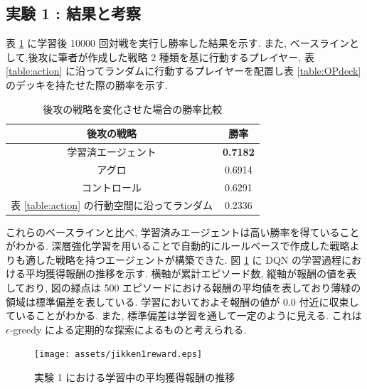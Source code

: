 \documentclass[12pt]{jarticle}
\begin{document}
\subsection{実験 1 : 結果と考察}
表 \ref{table:winratejikken1} に学習後 10000 回対戦を実行し勝率した結果を示す. また, ベースラインとして,後攻に筆者が作成した戦略 2 種類を基に行動するプレイヤー, 表 \ref{table:action} に沿ってランダムに行動するプレイヤーを配置し表 \ref{table:OPdeck} のデッキを持たせた際の勝率を示す. 
\begin{table}[ht]
  \centering
  \caption{後攻の戦略を変化させた場合の勝率比較}
  \label{table:winratejikken1}
  \begin{tabular}{|c|c|}
  \hline
  後攻の戦略        & 勝率     \\ \hline \hline
  学習済エージェント    & \textbf{0.7182} \\ \hline
  アグロ          & 0.6914 \\ \hline
  コントロール       & 0.6291 \\ \hline
  表 \ref{table:action} の行動空間に沿ってランダム & 0.2336       \\ \hline
  \end{tabular}
  \end{table}
  これらのベースラインと比べ, 学習済みエージェントは高い勝率を得ていることがわかる. 深層強化学習を用いることで自動的にルールベースで作成した戦略よりも適した戦略を持つエージェントが構築できた.
  図 \ref{fig:jikken1reward} に DQN の学習過程における平均獲得報酬の推移を示す. 横軸が累計エピソード数, 縦軸が報酬の値を表しており, 図の緑点は 500 エピソードにおける報酬の平均値を表しており薄緑の領域は標準偏差を表している. 学習においておよそ報酬の値が 0.0 付近に収束していることがわかる. また, 標準偏差は学習を通して一定のように見える. これは $\epsilon$-greedy による定期的な探索によるものと考えられる.
  \begin{figure}[ht]
    \centering
    \texttt{[image: assets/jikken1reward.eps]}
    \vspace{-0.3cm}
    \caption{実験 1 における学習中の平均獲得報酬の推移}
    \label{fig:jikken1reward}
  \end{figure}
  
\end{document}
